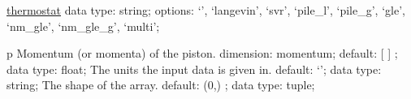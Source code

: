 \begin{ipifield}{}
\begin{ipifield}{\hyperref[THERMOSTATS]{thermostat}}
{{data type: string; options: `', `langevin', `svr', `pile\_l', `pile\_g', `gle', `nm\_gle', `nm\_gle\_g', `multi'; }%
}
\end{ipifield}
\begin{ipifield}{p}%
{Momentum (or momenta) of the piston.}%
{dimension: momentum; default:  [ ] ; data type: float; }%
{%
{The units the input data is given in.}%
{default: `'; data type: string; }%
%
{The shape of the array.}%
{default:  (0,) ; data type: tuple; }%
}
\end{ipifield}
\end{ipifield}
